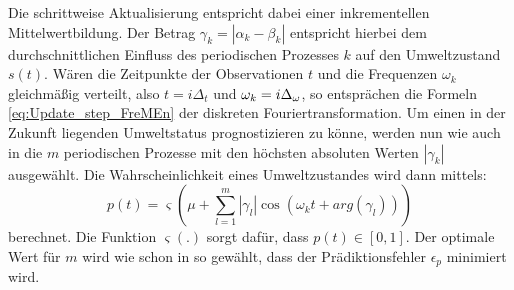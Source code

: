 Die schrittweise Aktualisierung entspricht dabei einer inkrementellen Mittelwertbildung. Der Betrag $\gamma_k = |\alpha_k - \beta_k|$ entspricht hierbei dem durchschnittlichen Einfluss des periodischen Prozesses $k$ auf den Umweltzustand $s(t)$.
Wären die Zeitpunkte der Observationen $t$ und die Frequenzen $\omega_k$ gleichmäßig verteilt, also $t=i\Delta_t$ und $\omega_k = i\Delta_{\mathrm{\omega}}$, so entsprächen die Formeln \ref{eq:Update_step_FreMEn} der diskreten Fouriertransformation.
Um einen in der Zukunft liegenden Umweltstatus prognostizieren zu könne, werden nun wie auch in \cite{Krajnik.2014} die $m$ periodischen Prozesse mit den höchsten absoluten Werten $|\gamma_k|$ ausgewählt. Die Wahrscheinlichkeit eines Umweltzustandes wird dann mittels:
\begin{equation}
	p(t) = \varsigma(\mu + \sum_{l=1}^{m} |\gamma_l|\cos(\omega_k t + arg(\gamma_l)))
	\label{eq:State_probability}
\end{equation}
berechnet. Die Funktion $\varsigma(.)$ sorgt dafür, dass $p(t) \in [0,1]$. Der optimale Wert für $m$ wird wie schon in \cite{Krajnik.2014} so gewählt, dass der Prädiktionsfehler $\epsilon_p$ minimiert wird. 
